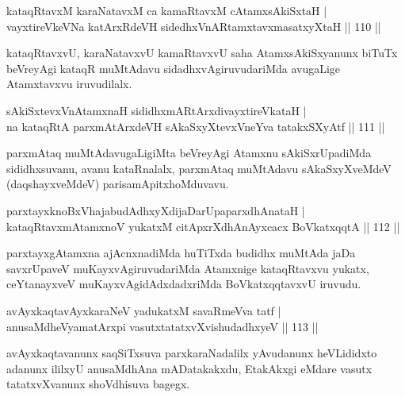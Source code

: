 \begin{shl}
kataqRtavxM karaNatavxM ca kamaRtavxM cA\s \s tamxsAkiSxtaH |\\
vayxtireVkeVNa katArxRdeVH sidedhxVnAR\s \s tamxtavxmasatxyXtaH \hfill || 110 ||
\end{shl}

\begin{artha}%
kataqRtavxvU, karaNatavxvU kamaRtavxvU saha AtamxsAkiSxyanunx biTuTx beVreyAgi kataqR muMtAdavu sidadhxvAgiruvudariMda avugaLige Atamxtavxvu iruvudilalx.
\end{artha}


\begin{shl}
sAkiSxtevxVnA\s \s tamxnaH sididhxmARtArxdivayxtireVkataH |\\
na kataqRtA parxmAtArxdeVH sAkaSxyXtevxVneYva tatakxSXyAtf \hfill || 111 ||
\end{shl}

\begin{artha}
parxmAtaq muMtAdavugaLigiMta beVreyAgi Atamxnu sAkiSxrUpadiMda sididhxsuvanu, avanu kataRnalalx, parxmAtaq muMtAdavu sAkaSxyXveMdeV (daqshayxveMdeV) parisamApitxhoMduvavu.
\end{artha}


\begin{shl}
parxtayxknoBxVhajabudAdhxyXdijaDarUpaparxdhAnataH |\\
kataqRtavxmAtamxnoV yukatxM citApxrXdhAnAyxcacx BoVkatxqqtA \hfill || 112 ||
\end{shl}

\begin{artha}
parxtayxgAtamxna ajAcnxnadiMda huTiTxda budidhx muMtAda jaDa savxrUpaveV muKayxvAgiruvudariMda Atamxnige kataqRtavxvu yukatx, ceYtanayxveV muKayxvAgidAdxdadxriMda BoVkatxqqtavxvU iruvudu. 
\end{artha}

\begin{shl}
avAyxkaqtavAyxkaraNeV yadukatxM savaRmeVva tatf |\\
anusaMdheVyamatArxpi vasutxtatatxvXvishudadhxyeV \hfill || 113 ||
\end{shl}

\begin{artha}
avAyxkaqtavanunx saqSiTxsuva parxkaraNadalilx yAvudanunx heVLididxto adanunx ililxyU anusaMdhAna mADatakakxdu, EtakAkxgi eMdare vasutx tatatxvXvanunx shoVdhisuva bagegx.
\end{artha}

